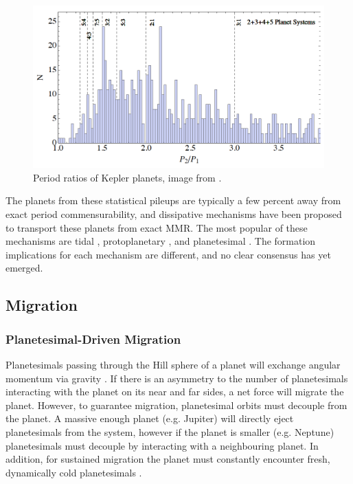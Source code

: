 \documentclass[12pt,letter]{aastex}
\begin{document}
\begin{figure}
\centering
\includegraphics[width=1.00\textwidth]{Figures/KeplerPeriods.png}
\caption{
\footnotesize Period ratios of Kepler planets, image from \citet{Goldreich2014}.}
\label{fig:KepMMR}
\end{figure}

The planets from these statistical pileups are typically a few percent away from exact period commensurability, and dissipative mechanisms have been proposed to transport these planets from exact MMR. 
The most popular of these mechanisms are tidal \citep{LithwickWu2012, Batygin2013, Delisle2014}, protoplanetary \citep{Rein2012b, Baruteau2013, Goldreich2014}, and planetesimal \citep{Moore2013, Chatterjee2015}.
The formation implications for each mechanism are different, and no clear consensus has yet emerged.


\subsection{Migration}
\subsubsection{Planetesimal-Driven Migration}
Planetesimals passing through the Hill sphere of a planet will exchange angular momentum via gravity \citep{Ida2000, Kirsh2009}.
If there is an asymmetry to the number of planetesimals interacting with the planet on its near and far sides, a net force will migrate the planet. 
However, to guarantee migration, planetesimal orbits must decouple from the planet. 
A massive enough planet (e.g. Jupiter) will directly eject planetesimals from the system, however if the planet is smaller (e.g. Neptune) planetesimals must decouple by interacting with a neighbouring planet. 
In addition, for sustained migration the planet must constantly encounter fresh, dynamically cold planetesimals \citep{Armitage2010}.  
\end{document}

